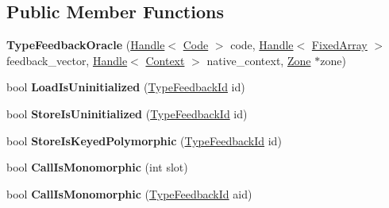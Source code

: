 \subsection*{Public Member Functions}
\begin{DoxyCompactItemize}
\item 
\hypertarget{classv8_1_1internal_1_1_type_feedback_oracle_aa2ec715453269b6b729b3b32762a61a3}{}{\bfseries Type\+Feedback\+Oracle} (\hyperlink{classv8_1_1internal_1_1_handle}{Handle}$<$ \hyperlink{classv8_1_1internal_1_1_code}{Code} $>$ code, \hyperlink{classv8_1_1internal_1_1_handle}{Handle}$<$ \hyperlink{classv8_1_1internal_1_1_fixed_array}{Fixed\+Array} $>$ feedback\+\_\+vector, \hyperlink{classv8_1_1internal_1_1_handle}{Handle}$<$ \hyperlink{classv8_1_1internal_1_1_context}{Context} $>$ native\+\_\+context, \hyperlink{classv8_1_1internal_1_1_zone}{Zone} $\ast$zone)\label{classv8_1_1internal_1_1_type_feedback_oracle_aa2ec715453269b6b729b3b32762a61a3}

\item 
\hypertarget{classv8_1_1internal_1_1_type_feedback_oracle_a0531514b7740f6aea9be2b8c02f444e7}{}bool {\bfseries Load\+Is\+Uninitialized} (\hyperlink{classv8_1_1internal_1_1_type_feedback_id}{Type\+Feedback\+Id} id)\label{classv8_1_1internal_1_1_type_feedback_oracle_a0531514b7740f6aea9be2b8c02f444e7}

\item 
\hypertarget{classv8_1_1internal_1_1_type_feedback_oracle_a681ec8eeb4f03ef3b76af944d9e1cea0}{}bool {\bfseries Store\+Is\+Uninitialized} (\hyperlink{classv8_1_1internal_1_1_type_feedback_id}{Type\+Feedback\+Id} id)\label{classv8_1_1internal_1_1_type_feedback_oracle_a681ec8eeb4f03ef3b76af944d9e1cea0}

\item 
\hypertarget{classv8_1_1internal_1_1_type_feedback_oracle_adad3f2fdf5e059fc8b3ceaf8e3f0062d}{}bool {\bfseries Store\+Is\+Keyed\+Polymorphic} (\hyperlink{classv8_1_1internal_1_1_type_feedback_id}{Type\+Feedback\+Id} id)\label{classv8_1_1internal_1_1_type_feedback_oracle_adad3f2fdf5e059fc8b3ceaf8e3f0062d}

\item 
\hypertarget{classv8_1_1internal_1_1_type_feedback_oracle_afa9d34b9181f9f4f523ac22dc574a69f}{}bool {\bfseries Call\+Is\+Monomorphic} (int slot)\label{classv8_1_1internal_1_1_type_feedback_oracle_afa9d34b9181f9f4f523ac22dc574a69f}

\item 
\hypertarget{classv8_1_1internal_1_1_type_feedback_oracle_a27f697eda59f1c1c2f9d98e9aad2b46a}{}bool {\bfseries Call\+Is\+Monomorphic} (\hyperlink{classv8_1_1internal_1_1_type_feedback_id}{Type\+Feedback\+Id} aid)\label{classv8_1_1internal_1_1_type_feedback_oracle_a27f697eda59f1c1c2f9d98e9aad2b46a}


\end{DoxyCompactItemize}

